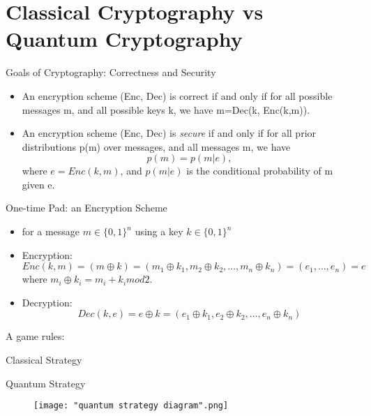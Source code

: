 \documentclass[handout, 10 pt]{beamer}
\begin{document}
\section{Classical Cryptography vs Quantum Cryptography}
\begin{frame}{Goals of Cryptography: Correctness and Security}
\begin{itemize}
\item An encryption scheme (Enc, Dec) is correct if and only if for all possible messages m, and all possible keys k, we have m=Dec(k, Enc(k,m)).
\smallskip
\pause
\item An encryption scheme (Enc, Dec) is \textit{secure} if and only if for all prior distributions p(m) over messages, and all messages m, we have
\begin{equation}
    p(m)=p(m|e),
\end{equation}
where $e=Enc(k,m)$, and $p(m|e)$ is the conditional probability of m given e.
\end{itemize}

\end{frame}
\begin{frame}{One-time Pad: an Encryption Scheme}
\begin{itemize}
    \item for a message $m \in \{0, 1\}^n$ using a key $k \in \{0, 1\}^n$
    \pause
    \item Encryption:
    \begin{equation}
    Enc(k,m)=(m \oplus k)=(m_1 \oplus k_1, m_2 \oplus k_2, \hdots, m_n \oplus k_n)=(e_1, \hdots, e_n)=e
    \end{equation}
    where $m_i \oplus k_i = m_i + k_i mod 2$.
    \pause
    \item Decryption:
    \begin{equation}
Dec(k, e)=e \oplus k = (e_1 \oplus k_1, e_2 \oplus k_2, \hdots, e_n \oplus k_n)
\end{equation}

\end{itemize}
\end{frame}

\begin{frame}{A game}
    rules:
\end{frame}

\begin{frame}{Classical Strategy}
    
\end{frame}

\begin{frame}{Quantum Strategy}
    \begin{figure}[h]
    \centering
    \texttt{[image: "quantum strategy diagram".png]}
    \label{fig: quantum strategy diagram}
\end{figure}
\end{frame}
\end{document}
